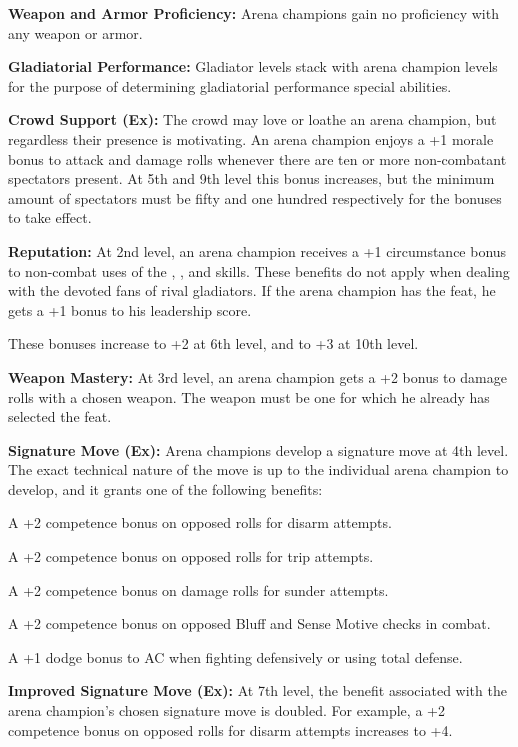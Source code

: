 {
\textbf{Weapon and Armor Proficiency:} Arena champions gain no proficiency with any weapon or armor.

\textbf{Gladiatorial Performance:} Gladiator levels stack with arena champion levels for the purpose of determining gladiatorial performance special abilities.

\textbf{Crowd Support (Ex):} The crowd may love or loathe an arena champion, but regardless their presence is motivating. An arena champion enjoys a +1 morale bonus to attack and damage rolls whenever there are ten or more non-combatant spectators present. At 5th and 9th level this bonus increases, but the minimum amount of spectators must be fifty and one hundred respectively for the bonuses to take effect.

\textbf{Reputation:} At 2nd level, an arena champion receives a +1 circumstance bonus to non-combat uses of the , ,  and  skills. These benefits do not apply when dealing with the devoted fans of rival gladiators. If the arena champion has the  feat, he gets a +1 bonus to his leadership score.

These bonuses increase to +2 at 6th level, and to +3 at 10th level.

\textbf{Weapon Mastery:} At 3rd level, an arena champion gets a +2 bonus to damage rolls with a chosen weapon. The weapon must be one for which he already has selected the  feat.

\textbf{Signature Move (Ex):} Arena champions develop a signature move at 4th level. The exact technical nature of the move is up to the individual arena champion to develop, and it grants one of the following benefits:
\begin{itemize*}
\item A +2 competence bonus on opposed rolls for disarm attempts.
\item A +2 competence bonus on opposed rolls for trip attempts.
\item A +2 competence bonus on damage rolls for sunder attempts.
\item A +2 competence bonus on opposed Bluff and Sense Motive checks in combat.
\item A +1 dodge bonus to AC when fighting defensively or using total defense.
\end{itemize*}

\textbf{Improved Signature Move (Ex):} At 7th level, the benefit associated with the arena champion's chosen signature move is doubled. For example, a +2 competence bonus on opposed rolls for disarm attempts increases to +4.

}
